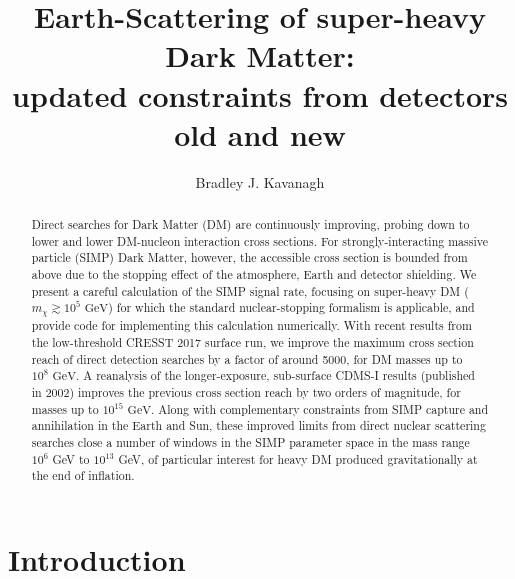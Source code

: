 \documentclass[prd,twocolumn,showpacs,nofootinbib,aps]{revtex4-1}
\begin{document}
\title{Earth-Scattering of super-heavy Dark Matter: \\updated constraints from detectors old and new}
\author{Bradley J. Kavanagh}


\begin{abstract}
Direct searches for Dark Matter (DM) are continuously improving, probing down to lower and lower DM-nucleon interaction cross sections. For strongly-interacting massive particle (SIMP) Dark Matter, however, the accessible cross section is bounded from above due to the stopping effect of the atmosphere, Earth and detector shielding. We present a careful calculation of the SIMP signal rate, focusing on super-heavy DM ($m_\chi \gtrsim 10^5 \,\,\mathrm{GeV}$) for which the standard nuclear-stopping formalism is applicable, and provide code for implementing this calculation numerically. With recent results from the low-threshold CRESST 2017 surface run, we improve the maximum cross section reach of direct detection searches by a factor of around 5000, for DM masses up to $10^8 \,\,\mathrm{GeV}$. A reanalysis of the longer-exposure, sub-surface CDMS-I results (published in 2002) improves the previous cross section reach by two orders of magnitude, for masses up to $10^{15} \,\,\mathrm{GeV}$. Along with complementary constraints from SIMP capture and annihilation in the Earth and Sun, these improved limits from direct nuclear scattering searches close a number of windows in the SIMP parameter space in the mass range $10^6$ GeV to $10^{13}$ GeV, of particular interest for heavy DM produced gravitationally at the end of inflation.
 
\end{abstract}

\maketitle

\section{Introduction}
\label{sec:introduction}
\end{document}
